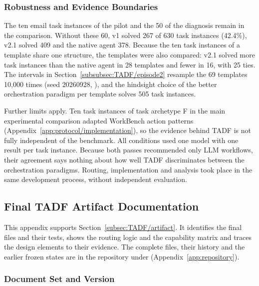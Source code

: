 \subsubsection{Robustness and Evidence Boundaries}
\label{app:eval2/limits}
The ten email task instances of the pilot and the 50 of the diagnosis remain in the comparison. Without these 60, v1 solved 267 of 630 task instances (42.4\%), v2.1 solved 409 and the native agent 378. Because the ten task instances of a template share one structure, the templates were also compared: v2.1 solved more task instances than the native agent in 28 templates and fewer in 16, with 25 ties. The intervals in Section~\ref{subsubsec:TADF/episode2} resample the 69 templates 10,000 times (seed 20260928, ), and the hindsight choice of the better orchestration paradigm per template solves 505 task instances.

Further limits apply. Ten task instances of task archetype F in the main experimental comparison adapted WorkBench action patterns (Appendix~\ref{app:protocol/implementation}), so the evidence behind TADF is not fully independent of the benchmark. All conditions used one model with one result per task instance. Because both passes recommended only LLM workflows, their agreement says nothing about how well TADF discriminates between the orchestration paradigms. Routing, implementation and analysis took place in the same development process, without independent evaluation.

\subsection{Final TADF Artifact Documentation}
\label{app:artifact}

This appendix supports Section~\ref{subsec:TADF/artifact}. It identifies the final files and their tests, shows the routing logic and the capability matrix and traces the design elements to their evidence. The complete files, their history and the earlier frozen states are in the repository under  (Appendix~\ref{app:repository}).

\subsubsection{Document Set and Version}
\label{app:artifact/files}

